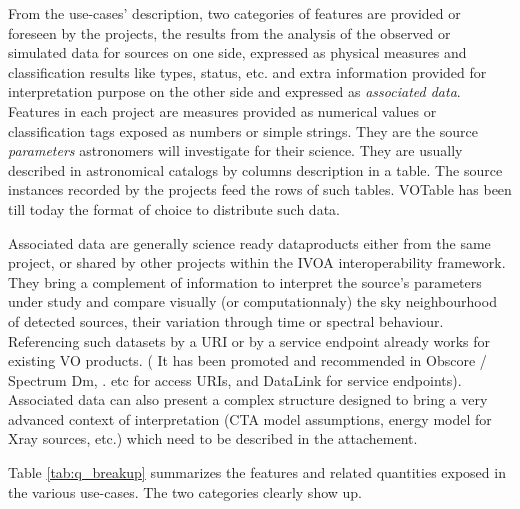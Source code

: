 \documentclass[11pt,a4paper]{ivoa}
\begin{document}
From the use-cases' description, two categories of features are provided or foreseen by the projects, the results from the analysis of the observed or simulated data for sources on one side, expressed as physical measures and classification results like types, status, etc. and extra information provided for interpretation purpose on the other side and expressed as \emph{associated data}.
Features in each project are measures provided as numerical values or classification tags exposed as numbers or simple strings. They are the source \emph{parameters} astronomers will investigate for their science.
They are usually described in astronomical catalogs by columns description in a table. The source instances recorded by the projects feed the rows of such tables.
VOTable has been till today the format of choice to distribute such data.

Associated data are generally science ready dataproducts either from the same project, or shared by other projects within the IVOA interoperability framework.
They bring a complement of information to interpret the source's  parameters under study and compare visually (or computationnaly) the sky neighbourhood of detected sources, their variation through time or spectral behaviour.
Referencing such datasets by a URI or by a service endpoint already works for existing VO products. ( It has been promoted and recommended in Obscore / Spectrum Dm, . etc for access URIs, and DataLink for service endpoints).
Associated data can also present a complex structure designed to bring a very advanced context of interpretation (CTA model assumptions, energy model for Xray sources, etc.) which need to be described in the attachement.

Table  \ref{tab:q_breakup} summarizes the features and related quantities exposed in the various use-cases. The two categories clearly show up.
\end{document}
